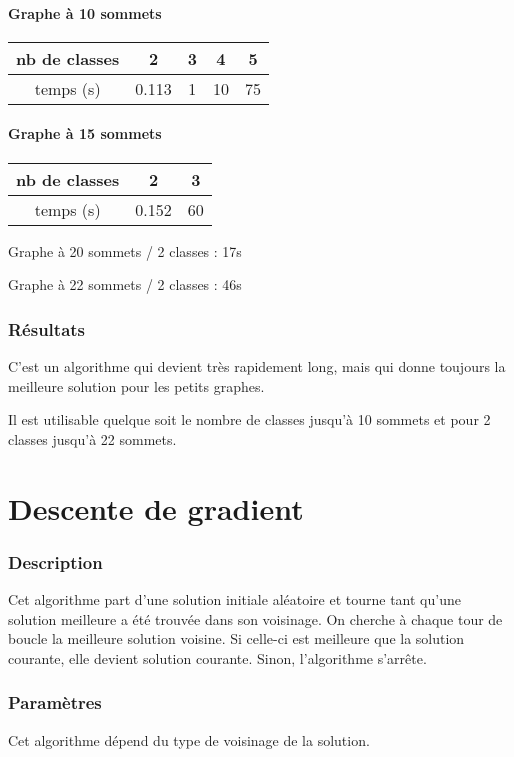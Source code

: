 \documentclass[12pt]{article}
\begin{document}
\subsection{Graphe à 10 sommets}

\begin{tabular}{|c|c|c|c|c|}
	\hline 
	nb de classes & 2 & 3 & 4 & 5 \\
	\hline
	temps (s) & 0.113 & 1 & 10 & 75 \\
	\hline
\end{tabular}

\subsection{Graphe à 15 sommets}

\begin{tabular}{|c|c|c |}
	\hline 
	nb de classes & 2 & 3 \\
	\hline
	temps (s) & 0.152 & 60 \\
	\hline
\end{tabular}

\bigskip
Graphe à 20 sommets / 2 classes : 17s

Graphe à 22 sommets / 2 classes : 46s

\section{Résultats}
C'est un algorithme qui devient très rapidement long, mais qui donne toujours la meilleure solution pour les petits graphes.

Il est utilisable quelque soit le nombre de classes jusqu’à 10 sommets et pour 2 classes jusqu’à 22 sommets.

\newpage

\part{Descente de gradient}
\section{Description}
Cet algorithme part d’une solution initiale aléatoire et tourne tant qu’une solution meilleure a été trouvée dans son voisinage. On cherche à chaque tour de boucle la meilleure solution voisine. Si celle-ci est meilleure que la solution courante, elle devient solution courante. Sinon, l’algorithme s’arrête.

\section{Paramètres}
Cet algorithme dépend du type de voisinage de la solution. 
\end{document}
